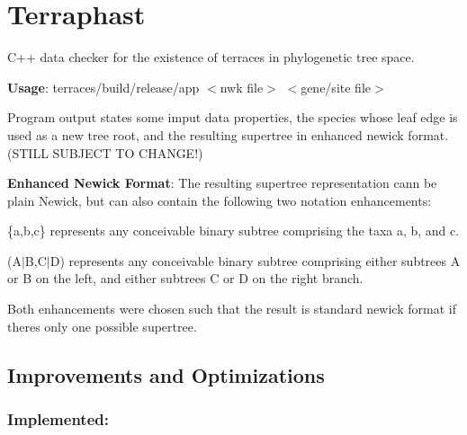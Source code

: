 \hypertarget{md_README_mainpage}{}\section{Terraphast }\label{md_README_mainpage}
C++ data checker for the existence of terraces in phylogenetic tree space.

{\bfseries Usage}\+: {\ttfamily terraces/build/release/app $<$nwk file$>$ $<$gene/site file$>$}

Program output states some imput data properties, the species whose leaf edge is used as a new tree root, and the resulting supertree in enhanced newick format. (S\+T\+I\+LL S\+U\+B\+J\+E\+CT TO C\+H\+A\+N\+G\+E!)

{\bfseries Enhanced Newick Format}\+: The resulting supertree representation cann be plain Newick, but can also contain the following two notation enhancements\+:
\begin{DoxyItemize}
\item {\ttfamily \{a,b,c\}} represents any conceivable binary subtree comprising the taxa a, b, and c.
\item {\ttfamily (A$\vert$B,C$\vert$D)} represents any conceivable binary subtree comprising either subtrees A or B on the left, and either subtrees C or D on the right branch.
\end{DoxyItemize}

Both enhancements were chosen such that the result is standard newick format if there\textquotesingle{}s only one possible supertree.

\subsection*{Improvements and Optimizations}

\subsubsection*{Implemented\+:}


